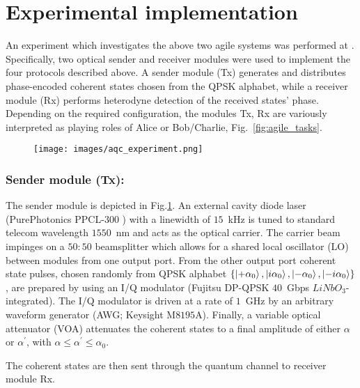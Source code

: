 \section{Experimental implementation}

An experiment which investigates the above two agile systems was performed at  \cite{Richter2020}. Specifically, two optical sender and receiver modules were used to implement the four protocols described above. A sender module (Tx) generates and distributes phase-encoded coherent states chosen from the QPSK alphabet, while a receiver module (Rx) performs heterodyne detection of the received states' phase. Depending on the required configuration, the modules Tx, Rx are variously interpreted as playing roles of Alice or Bob/Charlie, Fig.~\ref{fig:agile_tasks}. 

\begin{figure}[htp]
\centering
\texttt{[image: images/aqc\_experiment.png]}
\caption{\label{fig:aqc_experiment}}
\end{figure}

\subsubsection{Sender module (Tx):} The sender module is depicted in Fig.\ref{fig:aqc_experiment}. An external cavity diode laser (PurePhotonics PPCL-$300$ ) with a linewidth of $15$~kHz is tuned to standard telecom wavelength $1550$~nm and acts as the optical carrier. The carrier beam impinges on a $50:50$ beamsplitter which allows for a shared local oscillator (LO) between modules from one output port. From the other output port  coherent state pulses, chosen randomly from QPSK alphabet $\left\{ \ket{+ \alpha_0}, \ket{i \alpha_0}, \ket{-\alpha_0}, \ket{-i \alpha_0}\right\}$, are prepared by using an I/Q modulator (Fujitsu DP-QPSK $40$~Gbps $LiNbO_3$-integrated). The I/Q modulator is driven at a rate of $1$~GHz by an arbitrary waveform generator (AWG; Keysight M$8195$A). Finally, a variable optical attenuator (VOA) attenuates the coherent states to a final amplitude of either $\alpha$ or $\alpha^\prime$, with $\alpha \le \alpha^\prime \le \alpha_0$.

The coherent states are then sent through the quantum channel to receiver module Rx.

